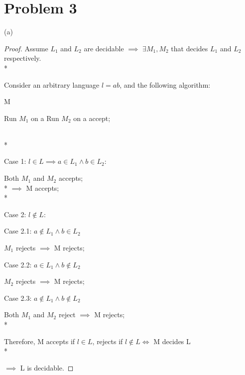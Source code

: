 \documentclass{article}
\begin{document}
\section*{Problem 3}
(a)
\begin{proof}
    Assume $L_1$ and $L_2$ are decidable $\implies$ $\exists M_1, M_2$ that decides $L_1$ and $L_2$ respectively.\\*

    Consider an arbitrary language $l=ab$, and the 
    following algorithm:
    \begin{algorithm}
        \caption{M}
        \DontPrintSemicolon
        Run $M_1$ on a\;
        Run $M_2$ on a\;
        \Return accept;
    \end{algorithm}\\*

    Case 1: $l \in L \implies a \in L_1 \land b \in L_2$:
    \begin{addmargin}[2em]{0em}
        Both $M_1$ and $M_2$ accepts; \\*
        $\implies$ M accepts;\\*
    \end{addmargin}

    Case 2: $l \notin L$:
    \begin{addmargin}[2em]{0em}
        Case 2.1: $a \notin L_1 \land b \in L_2$
        \begin{addmargin}[1em]{0em}
        $M_1$ rejects $\implies$ M rejects; 
        \end{addmargin}
        Case 2.2: $a \in L_1 \land b \notin L_2$
        \begin{addmargin}[1em]{0em}
        $M_2$ rejects $\implies$ M rejects;
        \end{addmargin}
        Case 2.3: $a \notin L_1 \land b \notin L_2$
        \begin{addmargin}[1em]{0em}
        Both $M_1$ and $M_2$ reject $\implies$ M rejects;\\*
        \end{addmargin}
    \end{addmargin}

    Therefore, M accepts if $l \in L$, rejects if $l \notin L \iff$ M decides L\\*
    
    $\implies$ L is decidable.
\end{proof}
\end{document}

